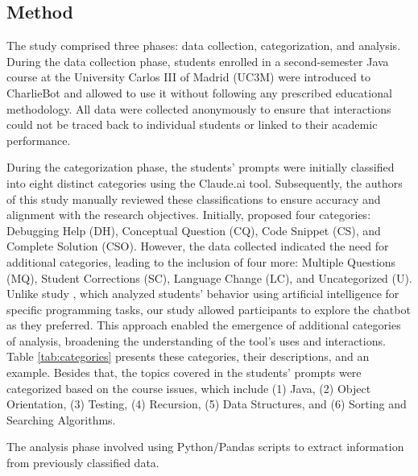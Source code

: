 \documentclass[sn-apa]{sn-jnl} %
\begin{document}
\subsection{Method}

The study comprised three phases: data collection, categorization, and analysis.
During the data collection phase, students enrolled in a second-semester Java
course at the University Carlos III of Madrid (UC3M) were introduced to
CharlieBot and allowed to use it without following any prescribed educational
methodology. All data were collected anonymously to ensure that interactions
could not be traced back to individual students or linked to their academic
performance.

During the categorization phase, the students' prompts were initially classified
into eight distinct categories using the Claude.ai \citep{claude} tool.
Subsequently, the authors of this study manually reviewed these classifications
to ensure accuracy and alignment with the research objectives.
Initially, \cite{Ghimire24} proposed four categories: Debugging Help (DH),
Conceptual Question (CQ), Code Snippet (CS), and Complete Solution (CSO).
However, the data collected indicated the need for additional categories,
leading to the inclusion of four more: Multiple Questions (MQ), Student
Corrections (SC), Language Change (LC), and Uncategorized (U). Unlike study
\cite{Ghimire24}, which analyzed students' behavior using artificial
intelligence for specific programming tasks, our study allowed participants to
explore the chatbot as they preferred. This approach enabled the emergence of
additional categories of analysis, broadening the understanding of the tool's
uses and interactions. Table \ref{tab:categories} presents these categories,
their descriptions, and an example. Besides that, the topics covered in the
students' prompts were categorized based on the course issues, which include
(1) Java, (2) Object Orientation, (3) Testing, (4) Recursion, (5) Data
Structures, and (6) Sorting and Searching Algorithms.

The analysis phase involved using Python/Pandas scripts to extract information
from previously classified data.



\end{document}
